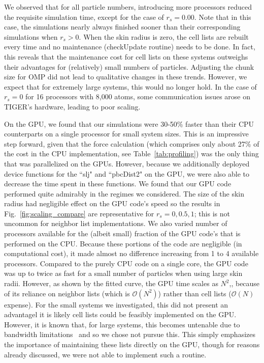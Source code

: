 \documentclass[12pt]{article}
\begin{document}
We observed that for all particle numbers, introducing more processors reduced the requisite simulation time, except for the case of $r_{s} = 0.00$. Note that in this case, the simulations nearly always finished sooner than their corresponding simulations when $r_s > 0$.  When the skin radius is zero, the cell lists are rebuilt every time and no maintenance (checkUpdate routine) needs to be done.  In fact, this reveals that the maintenance cost for cell lists on these systems outweighs their advantages for (relatively) small numbers of particles.  Adjusting the chunk size for OMP did not lead to qualitative changes in these trends.  However, we expect that for extremely large systems, this would no longer hold.  In the case of $r_s = 0$ for 16 processors with 8,000 atoms, some communication issues arose on TIGER's hardware, leading to poor scaling.  

On the GPU, we found that our simulations were 30-50\% faster than their CPU counterparts on a single processor for small system sizes.  This is an impressive step forward, given that the force calculation (which comprises only about 27\% of the cost in the CPU implementation, see Table~\ref{tab:profiling}) was the only thing that was parallelized on the GPUs.  However, because we additionally deployed device functions for the ``slj" and ``pbcDist2" on the GPU, we were also able to decrease the time spent in these functions. We found that our GPU code performed quite admirably in the regimes we considered.  The size of the skin radius had negligible effect on the GPU code's speed so the results in Fig.~\ref{fig:scaling_compare} are representative for $r_s = 0,0.5, 1$; this is not uncommon for neighbor list implementations.  We also varied number of processors available for the (albeit small) fraction of the GPU code's that is performed on the CPU.  Because these portions of the code are negligible (in computational cost), it made almost no difference increasing from 1 to 4 available processors.  Compared to the purely CPU code on a single core, the GPU code was up to twice as fast for a small number of particles when using large skin radii.  However, as shown by the fitted curve, the GPU time scales as $N^2$,, because of its reliance on neighbor lists (which is $\mathcal{O}(N^2)$) rather than cell lists ($\mathcal{O}(N)$ expense).  For the small systems we investigated, this did not present an advantagel it is likely cell lists could be feasibly implemented on the GPU.   However, it is known that, for large systems, this becomes untenable due to bandwidth limitations~\cite{Anderson2008, Lipscomb2012} and so we chose not pursue this.  This simply emphasizes the importance of maintaining these lists directly on the GPU, though for reasons already discussed, we were not able to implement such a routine.
\end{document}
